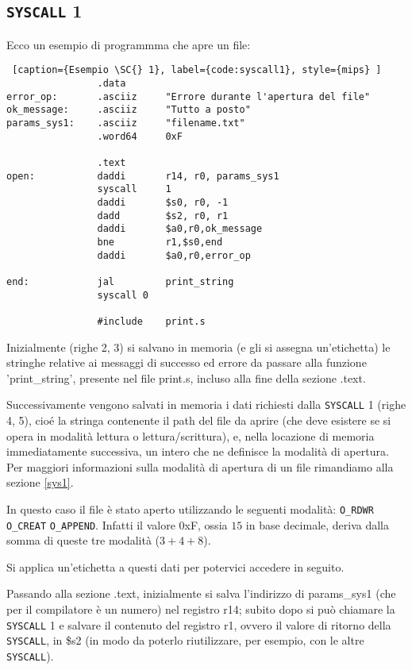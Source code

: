 \documentclass[12pt]{report}
\newcommand{\SC}{\texttt{SYSCALL}}
\begin{document}
\subsection{\SC{} 1}
Ecco un esempio di programmma che apre un file:
\begin{lstlisting} [caption={Esempio \SC{} 1}, label={code:syscall1}, style={mips} ] 
                .data 
error_op:       .asciiz     "Errore durante l'apertura del file"    
ok_message:     .asciiz     "Tutto a posto"
params_sys1:    .asciiz     "filename.txt"
                .word64     0xF                    

                .text
open:           daddi       r14, r0, params_sys1    
                syscall     1    
                daddi       $s0, r0, -1
                dadd        $s2, r0, r1        
                daddi       $a0,r0,ok_message            
                bne         r1,$s0,end            
                daddi       $a0,r0,error_op

end:            jal         print_string
                syscall 0
        
                #include    print.s      
\end{lstlisting}

Inizialmente (righe 2, 3) si salvano in memoria (e gli si assegna
un'etichetta) le stringhe relative ai messaggi di successo ed errore da passare 
alla funzione 'print\_string', presente nel file print.s, incluso alla fine
della sezione .text.

Successivamente vengono salvati in memoria i dati richiesti dalla \SC{} 1 (righe
4, 5), cio\'e la stringa contenente il path del file da aprire (che deve
esistere se si opera in modalit\`a lettura o lettura/scrittura), e, nella
locazione di memoria immediatamente successiva, un intero che ne definisce la
modalit\`a di apertura. Per maggiori informazioni sulla modalit\`a di apertura
di un file rimandiamo alla sezione \ref{sys1}.

In questo caso il file \`e stato aperto utilizzando le seguenti modalit\`a:
\texttt{O\_RDWR} \textbar{} \texttt{O\_CREAT} \textbar{} \texttt{O\_APPEND}. Infatti il valore
0xF, ossia $15$ in base decimale, deriva dalla somma di queste tre modalit\`a
($3+4+8$).

Si applica un'etichetta a questi dati per potervici accedere in seguito.

Passando alla sezione .text, inizialmente si salva
l'indirizzo di params\_sys1 (che per il compilatore \`{e} un numero) nel registro
r14; subito dopo si pu\`{o} chiamare la \SC{} 1 e salvare il contenuto del
registro r1, ovvero il valore di ritorno della \SC{}, in \$s2 (in modo da poterlo 
riutilizzare, per esempio, con le altre \SC{}).
\end{document}

